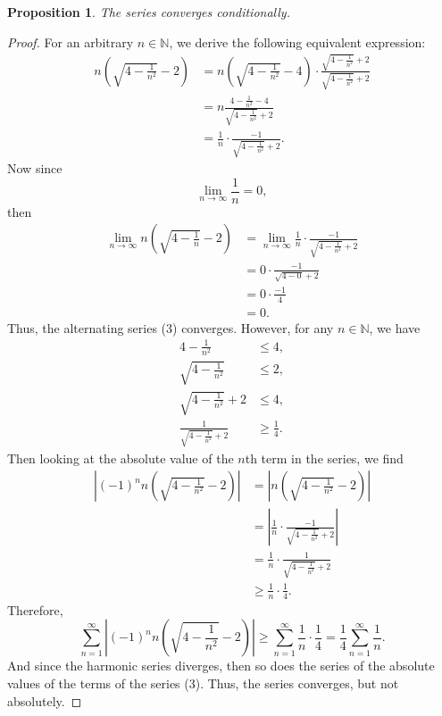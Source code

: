 \documentclass[12pt]{article}
\newtheorem{proposition}{Proposition}
\newcommand{\N}{\mathbb{N}} %
\newcommand{\<}{\left\langle} %
\renewcommand{\>}{\right\rangle} %
\begin{document}
\begin{proposition}
    The series converges conditionally.
\end{proposition}

\begin{proof}
    For an arbitrary $n \in \N$, we derive the following equivalent expression:
    \begin{align*}
        n \left( \sqrt{4 - \frac{1}{n^2}} - 2 \right)
            &= n \left( \sqrt{4 - \frac{1}{n^2}} - 4 \right) \cdot \frac{\sqrt{4 - \frac{1}{n^2}} + 2}{\sqrt{4 - \frac{1}{n^2}} + 2} \\
            &= n \frac{4 - \frac{1}{n^2} - 4}{\sqrt{4 - \frac{1}{n^2}} + 2} \\
            &= \frac{1}{n} \cdot \frac{-1}{\sqrt{4 - \frac{1}{n^2}} + 2}.
    \end{align*}
    Now since
    \[\lim_{n \to \infty} \frac{1}{n} = 0,\]
    then
    \begin{align*}
        \lim_{n \to \infty} n \left( \sqrt{4 - \frac{1}{n}} - 2 \right) 
            &= \lim_{n \to \infty} \frac{1}{n} \cdot \frac{-1}{\sqrt{4 - \frac{1}{n^2}} + 2} \\
            &= 0 \cdot \frac{-1}{\sqrt{4 - 0} + 2} \\
            &= 0 \cdot \frac{-1}{4} \\
            &= 0.
    \end{align*}
    Thus, the alternating series (3) converges. However, for any $n \in \N$, we have
    \begin{align*}
        4 - \frac{1}{n^2} &\leq 4, \\
        \sqrt{4 - \frac{1}{n^2}} &\leq 2, \\
        \sqrt{4 - \frac{1}{n^2}} + 2 &\leq 4, \\
        \frac{1}{\sqrt{4 - \frac{1}{n^2}} + 2} &\geq \frac{1}{4}.
    \end{align*}
    Then looking at the absolute value of the $n$th term in the series, we find
    \begin{align*}
        \left| (-1)^n n\left (\sqrt{4 - \frac{1}{n^2}} -2 \right) \right|
            &= \left| n\left (\sqrt{4 - \frac{1}{n^2}} -2 \right) \right| \\
            &= \left| \frac{1}{n} \cdot \frac{-1}{\sqrt{4 - \frac{1}{n^2}} + 2} \right| \\
            &= \frac{1}{n} \cdot \frac{1}{\sqrt{4 - \frac{1}{n^2}} + 2} \\
            &\geq \frac{1}{n} \cdot \frac{1}{4}.
    \end{align*}
    Therefore, 
    \[\sum_{n=1}^\infty \left| (-1)^n n\left (\sqrt{4 - \frac{1}{n^2}} -2 \right) \right| \geq \sum_{n=1}^\infty \frac{1}{n} \cdot \frac{1}{4} = \frac{1}{4}\sum_{n=1}^\infty \frac{1}{n}.\]
    And since the harmonic series diverges, then so does the series of the absolute values of the terms of the series (3). Thus, the series converges, but not absolutely.
    
\end{proof}
\end{document}
